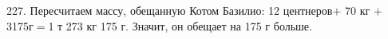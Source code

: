 227. Пересчитаем массу, обещанную Котом Базилио: 12 центнеров$+$ 70 кг $+$ 3175г$=$1 т 273 кг 175 г. Значит, он обещает на 175 г больше.\\

